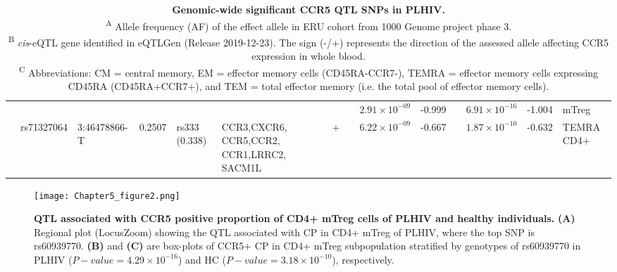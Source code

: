 \documentclass{book}
\begin{document}
\begin{refsection}
\begin{landscape}
\begin{table}
\begin{tabular}{m{0.4cm}m{1cm}m{1.5cm}p{0.5cm}p{1cm}p{1.3cm}p{0.4cm}p{0cm}p{1.3cm}p{0.7cm}p{0cm}p{1.3cm}p{0.7cm}p{1.6cm}}
    \cline{9-14}
                          &                              &                                &                          &                                     &                                                        &                     && $2.91 \times 10^{-09}$ & -0.999 && $6.91 \times 10^{-16}$ & -1.004      & mTreg            \\
    \cline{2-14}
                          & rs71327064                   & 3:46478866-T                   & 0.2507                   & rs333 (0.338)                       & CCR3,CXCR6, CCR5,CCR2, CCR1,LRRC2, SACM1L              & +                   && $6.22 \times 10^{-09}$ & -0.667 && $1.87 \times 10^{-10}$ & -0.632      & TEMRA CD4+  \\
    \hline
  \end{tabular}
  \caption{
    \label{tab:chp5tab1} \textbf{Genomic-wide significant CCR5 QTL SNPs in PLHIV.} \\
    \textsuperscript{A} Allele frequency (AF) of the effect allele in ERU cohort from 1000 Genome project phase 3. \\
    \textsuperscript{B} \textit{cis}-eQTL gene identified in eQTLGen (Release 2019-12-23). The sign (-/+) represents the direction of the assessed allele affecting CCR5 expression in whole blood. \\
    \textsuperscript{C} Abbreviations: CM = central memory, EM = effector memory cells (CD45RA-CCR7-), TEMRA = effector memory cells expressing CD45RA (CD45RA+CCR7+), and TEM = total effector memory (i.e. the total pool of effector memory cells).
  }
\end{table}
\end{landscape}

\begin{figure}
  \centering
  \texttt{[image: Chapter5\_figure2.png]}
  \caption{\label{fig:chp5fig2} \textbf{QTL associated with CCR5 positive proportion of CD4+ mTreg cells of PLHIV and healthy individuals.}
  \textbf{(A)} Regional plot (LocusZoom) showing the QTL associated with CP in CD4+ mTreg of PLHIV, where the top SNP is rs60939770.
  \textbf{(B)} and \textbf{(C)} are box-plots of CCR5+ CP in CD4+ mTreg subpopulation stratified by genotypes of rs60939770 in PLHIV ($P-value = 4.29 \times 10^{-16}$) and HC ($P-value = 3.18 \times 10^{-10}$), respectively.
  }
\end{figure}


\end{refsection}
\end{document}
